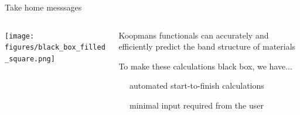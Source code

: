 \documentclass[xcolor=table,aspectratio=169]{beamer}
\numberwithin{equation}{section}
\begin{document}
% 
% 
% 
% 
% 
% 
\begin{frame}{Take home messsages}

   \begin{columns}
      \begin{column}{0.5\textwidth}
         \texttt{[image: figures/black\_box\_filled\_square.png]}
      \end{column}
      \begin{column}{0.5\textwidth}

         Koopmans functionals can accurately and efficiently predict the band structure of materials

         \vspace{1ex}
         To make these calculations black box, we have...

         \vspace{1ex}
         \ %
         \ automated start-to-finish calculations 

         \vspace{1ex}
         \ %
         \ minimal input required from the user 
      \end{column}
   \end{columns}
\end{frame}
\end{document}
